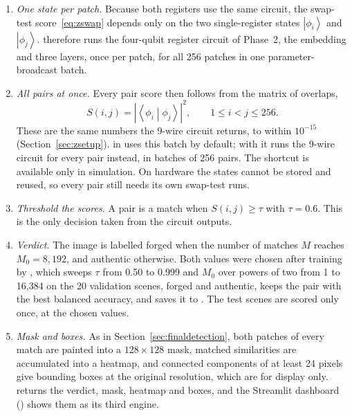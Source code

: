 \documentclass[conference]{IEEEtran}
\newcommand{\ket}[1]{\left|#1\right\rangle}
\newcommand{\braket}[2]{\left\langle#1\middle|#2\right\rangle}
\begin{document}
\begin{enumerate}
\item \emph{One state per patch.} Because both registers use the same circuit, the swap-test score~\eqref{eq:zswap} depends only on the two single-register states $\ket{\phi_i}$ and $\ket{\phi_j}$.  therefore runs the four-qubit register circuit of Phase~2, the embedding and three layers, once per patch, for all 256 patches in one parameter-broadcast batch.
\item \emph{All pairs at once.} Every pair score then follows from the matrix of overlaps,
\begin{equation}
S(i,j) = |\braket{\phi_i}{\phi_j}|^2, \qquad 1\le i<j\le 256 .
\label{eq:zbatch}
\end{equation}
These are the same numbers the 9-wire circuit returns, to within $10^{-15}$ (Section~\ref{sec:zsetup}).  in  uses this batch by default; with  it runs the 9-wire circuit for every pair instead, in batches of 256 pairs. The shortcut is available only in simulation. On hardware the states cannot be stored and reused, so every pair still needs its own swap-test runs.
\item \emph{Threshold the scores.} A pair is a match when $S(i,j)\ge\tau$ with $\tau = 0.6$. This is the only decision taken from the circuit outputs.
\item \emph{Verdict.} The image is labelled forged when the number of matches $M$ reaches $M_0 = 8{,}192$, and authentic otherwise. Both values were chosen after training by , which sweeps $\tau$ from 0.50 to 0.999 and $M_0$ over powers of two from 1 to 16,384 on the 20 validation scenes, forged and authentic, keeps the pair with the best balanced accuracy, and saves it to . The test scenes are scored only once, at the chosen values.
\item \emph{Mask and boxes.} As in Section~\ref{sec:finaldetection}, both patches of every match are painted into a $128\times128$ mask, matched similarities are accumulated into a heatmap, and connected components of at least 24 pixels give bounding boxes at the original resolution, which are for display only.  returns the verdict, mask, heatmap and boxes, and the Streamlit dashboard () shows them as its third engine.
\end{enumerate}
\end{document}
